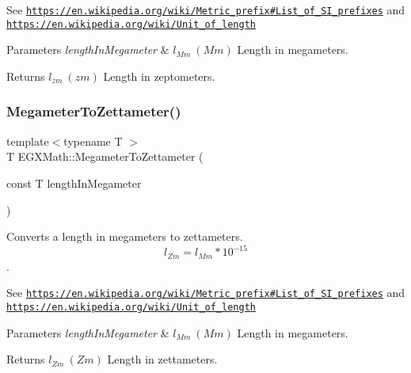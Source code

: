 See \href{https://en.wikipedia.org/wiki/Metric_prefix#List_of_SI_prefixes}{\tt https\+://en.\+wikipedia.\+org/wiki/\+Metric\+\_\+prefix\#\+List\+\_\+of\+\_\+\+S\+I\+\_\+prefixes} and \href{https://en.wikipedia.org/wiki/Unit_of_length}{\tt https\+://en.\+wikipedia.\+org/wiki/\+Unit\+\_\+of\+\_\+length} 
\begin{DoxyParams}{Parameters}
{\em length\+In\+Megameter} & $ l_{Mm}\ (Mm)$ Length in megameters. \\
\hline
\end{DoxyParams}
\begin{DoxyReturn}{Returns}
$ l_{zm}\ (zm)$ Length in zeptometers. 
\end{DoxyReturn}
\mbox{\label{group___e_g_x_math-_conversions-_length_conversions-_megameter-_s_i_ga3a8765b61b237025a1f8a72a25443cd7}} 
\subsubsection{\texorpdfstring{Megameter\+To\+Zettameter()}{MegameterToZettameter()}}
{\footnotesize\ttfamily template$<$typename T $>$ \\
T E\+G\+X\+Math\+::\+Megameter\+To\+Zettameter (\begin{DoxyParamCaption}\item[{const T}]{length\+In\+Megameter }\end{DoxyParamCaption})}



Converts a length in megameters to zettameters. \[ l_{Zm}=l_{Mm} * 10^{-15} \]. 

See \href{https://en.wikipedia.org/wiki/Metric_prefix#List_of_SI_prefixes}{\tt https\+://en.\+wikipedia.\+org/wiki/\+Metric\+\_\+prefix\#\+List\+\_\+of\+\_\+\+S\+I\+\_\+prefixes} and \href{https://en.wikipedia.org/wiki/Unit_of_length}{\tt https\+://en.\+wikipedia.\+org/wiki/\+Unit\+\_\+of\+\_\+length} 
\begin{DoxyParams}{Parameters}
{\em length\+In\+Megameter} & $ l_{Mm}\ (Mm)$ Length in megameters. \\
\hline
\end{DoxyParams}
\begin{DoxyReturn}{Returns}
$ l_{Zm}\ (Zm)$ Length in zettameters. 
\end{DoxyReturn}
